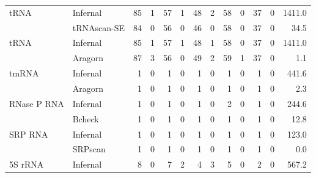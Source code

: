 \begin{footnotesize}
\begin{table}
\begin{center}
\begin{tabular}{|l|l|rr|rr|rr|rr|rr|r|}
tRNA             &  Infernal         &   85 &   1 &   57 &   1 &   48 &   2 &   58 &   0 &   37 &   0 & 1411.0  \\ 
                 &  tRNAscan-SE      &   84 &   0 &   56 &   0 &   46 &   0 &   58 &   0 &   37 &   0 &  34.5  \\ \hline
tRNA             &  Infernal         &   85 &   1 &   57 &   1 &   48 &   1 &   58 &   0 &   37 &   0 & 1411.0  \\ 
                 &  Aragorn          &   87 &   3 &   56 &   0 &   49 &   2 &   59 &   1 &   37 &   0 &   1.1  \\ \hline
tmRNA            &  Infernal         &    1 &   0 &    1 &   0 &    1 &   0 &    1 &   0 &    1 &   0 & 441.6  \\ 
                 &  Aragorn          &    1 &   0 &    1 &   0 &    1 &   0 &    1 &   0 &    1 &   0 &   2.3  \\ \hline
RNase P RNA      &  Infernal         &    1 &   0 &    1 &   0 &    1 &   0 &    2 &   0 &    1 &   0 & 244.6  \\ 
                 &  Bcheck           &    1 &   0 &    1 &   0 &    1 &   0 &    1 &   0 &    1 &   0 &  12.8  \\ \hline
SRP RNA          &  Infernal         &    1 &   0 &    1 &   0 &    1 &   0 &    1 &   0 &    1 &   0 & 123.0  \\ 
                 &  SRPscan          &    1 &   0 &    1 &   0 &    1 &   0 &    1 &   0 &    1 &   0 &   0.0  \\ \hline
5S rRNA          &  Infernal         &    8 &   0 &    7 &   2 &    4 &   3 &    5 &   0 &    2 &   0 & 567.2  \\ 

\end{tabular}
\end{center}
\end{table}
\end{footnotesize}
